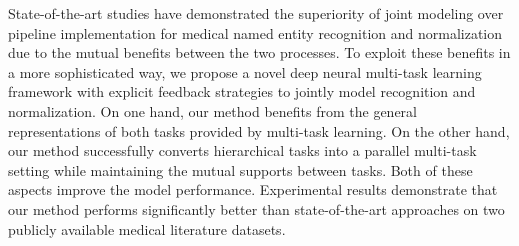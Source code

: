 
State-of-the-art studies have demonstrated the superiority of joint modeling over pipeline implementation for medical named entity recognition and normalization due to the mutual benefits between the two processes. 
To exploit these benefits in a more sophisticated way, we propose a novel deep neural multi-task learning framework with explicit feedback strategies to jointly model recognition and normalization.
On one hand, our method benefits from the general representations of both tasks provided by multi-task learning.
On the other hand, our method successfully converts hierarchical tasks into a parallel multi-task setting while maintaining the mutual supports between tasks. 
Both of these aspects improve the model performance. 
Experimental results demonstrate that our method performs significantly better than state-of-the-art approaches on two publicly available medical literature datasets.